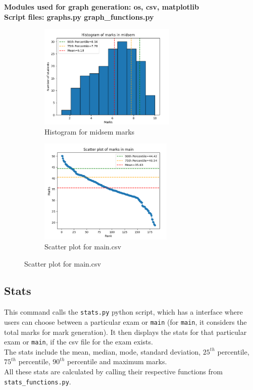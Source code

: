 \documentclass{article}
\begin{document}
\textbf{Modules used for graph generation: os, csv, matplotlib}\\

\textbf{Script files: graphs.py graph\_functions.py}

\begin{figure}[h]
    \begin{subfigure}{0.5\textwidth}
    \includegraphics[width=\linewidth, height=5cm]{histogram.png} 
    \caption{Histogram for midsem marks}
    \end{subfigure}
    \begin{subfigure}{0.5\textwidth}
    \includegraphics[width=\linewidth, height=5cm]{scatter-plot.png}
    \caption{Scatter plot for main.csv}
    \end{subfigure}
\end{figure}
\newpage

\subsection{Stats}
This command calls the \verb"stats.py" python script, which has a interface where users can choose between a particular exam or \verb"main" (for \verb"main", it considers the total marks for mark generation). It then displays the stats for that particular exam or \verb"main", if the csv file for the exam exists.\\
The stats include the mean, median, mode, standard deviation, $25^{th}$ percentile, $75^{th}$ percentile, $90^{th}$ percentile and maximum marks.\\
All these stats are calculated by calling their respective functions from \verb"stats_functions.py".\\
\end{document}
